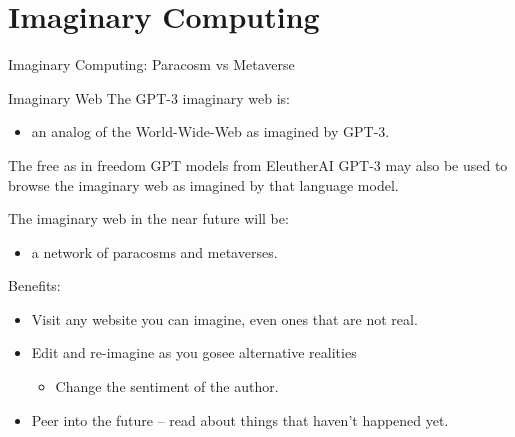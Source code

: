 \documentclass[presentation]{beamer}
\begin{document}
\section{Imaginary Computing}
\label{sec:org2651c64}
\begin{frame}[label={sec:org2e39cdf}]{Imaginary Computing: Paracosm vs Metaverse}
\begin{block}{Imaginary Web}
The GPT-3 imaginary web is:
\begin{itemize}
\item an analog of the World-Wide-Web as imagined by GPT-3.
\end{itemize}

The free as in freedom GPT models from
EleutherAI GPT-3 may also be used to browse
the imaginary web as imagined by that language model.

The imaginary web in the near future will be:
\begin{itemize}
\item a network of paracosms and metaverses.
\end{itemize}

Benefits:
\begin{itemize}
\item Visit any website you can imagine, even ones that are not real.
\item Edit and re-imagine as you gosee alternative realities
\begin{itemize}
\item Change the sentiment of the author.
\end{itemize}
\item Peer into the future – read about things that haven't happened yet.
\end{itemize}
\end{block}
\end{frame}
\end{document}
